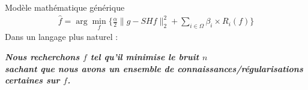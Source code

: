 \begin{frame}{Modèle mathématique générique}
\begin{align*}
\hat{f} = \arg\min\limits_{f} \{ 
    \frac{\alpha}{2} 
    \lVert g - SHf \rVert_{2}^{2}
    + \sum\limits_{i \in \Omega} \beta_{i} \times R_{i}(f)
\}  
\end{align*}
Dans un langage plus naturel :
\begin{center}
\textbf{
    \emph{
        Nous recherchons $f$ tel qu'il minimise le bruit $n$ \\
        sachant que nous avons un ensemble de 
        connaissances/régularisations \\
        certaines sur $f$. \\
    }
}
\end{center} 
\end{frame}




